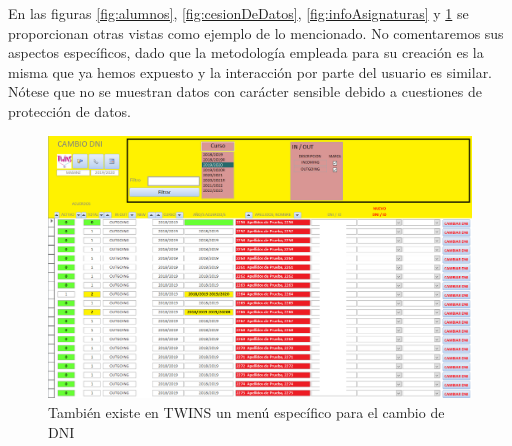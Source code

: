 En las figuras \ref{fig:alumnos}, \ref{fig:cesionDeDatos}, \ref{fig:infoAsignaturas} y \ref{fig:cambioDNI} se proporcionan otras vistas como ejemplo de lo mencionado. No comentaremos sus aspectos específicos, dado que la metodología empleada para su creación es la misma que ya hemos expuesto y la interacción por parte del usuario es similar. Nótese que no se muestran datos con carácter sensible debido a cuestiones de protección de datos.








\begin{figure}
	\includegraphics[width=\textwidth]{img/Capturas de TWINS/cambioDNI}
	\caption{También existe en TWINS un menú específico para el cambio de DNI}
	\label{fig:cambioDNI}
\end{figure}

